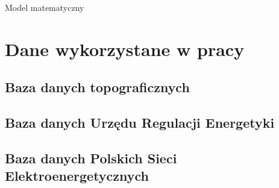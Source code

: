Model matematyczny

\section{Dane wykorzystane w pracy}

\subsection{Baza danych topograficznych}

\subsection{Baza danych Urzędu Regulacji Energetyki}

\subsection{Baza danych Polskich Sieci Elektroenergetycznych}


\section{}